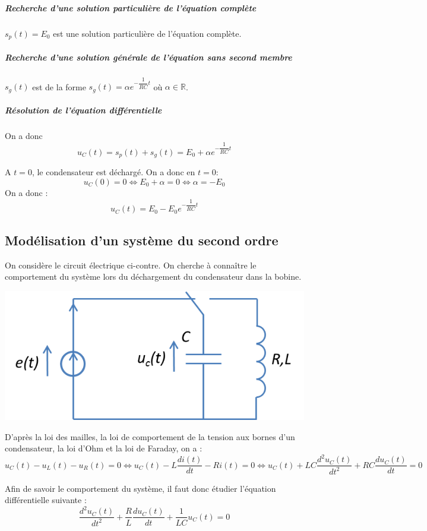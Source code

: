 \documentclass[10pt,fleqn]{article} %
\begin{document}
\subparagraph*{Recherche d'une solution particulière de l'équation complète}
$s_p(t)=E_0$ est une solution particulière de l'équation complète.

\subparagraph*{Recherche d'une solution générale de l'équation sans second membre}
$s_g(t)$ est de la forme $s_g(t)=\alpha e^{ - \dfrac{1}{RC} t}$ où $\alpha \in \mathbb{R}$.


\subparagraph*{Résolution de l'équation différentielle}
On a donc  
$$ u_C(t)=s_p(t) + s_g(t) =E_0 + \alpha  e^{-\dfrac{1}{RC}t}
$$

A $t=0$, le condensateur est déchargé. On a donc en $t=0$: 
$$ 
u_C(0)=0 \Longleftrightarrow E_0 + \alpha   = 0 \Longleftrightarrow \alpha  = -E_0    
$$
On a donc :
$$ u_C(t) = E_0 -E_0 e^{-\dfrac{1}{RC}t}
$$


\subsection{Modélisation d'un système du second ordre}

\begin{minipage}[c]{.6\linewidth}
On considère le circuit électrique ci-contre. On cherche à connaître le comportement du système lors du déchargement du condensateur dans la bobine.
\end{minipage}\hfill
\begin{minipage}[c]{.35\linewidth}
\begin{center}
\includegraphics[width=.9\textwidth]{images/RLC}
\end{center}
\end{minipage}

D'après la loi des mailles, la loi de comportement de la tension aux bornes d'un condensateur, la loi d'Ohm et la loi de Faraday, on a : 
$$
u_C(t)-u_L(t)-u_R(t)=0 
\Longleftrightarrow u_C(t) - L\dfrac{di(t)}{dt} -Ri(t)=0 
\Longleftrightarrow u_C(t) + LC\dfrac{d^2u_C(t)}{dt^2} +RC \dfrac{du_C(t)}{dt}=0 
$$


Afin de savoir le comportement du système, il faut donc étudier l'équation différentielle suivante :  
$$
\dfrac{d^2u_C(t)}{dt^2} +\dfrac{R}{L} \dfrac{du_C(t)}{dt} + \dfrac{1}{LC}u_C(t)=0 
$$
\end{document}
